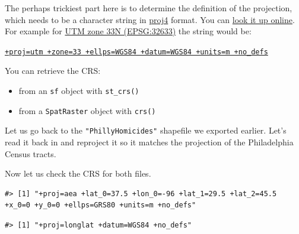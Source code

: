\documentclass[
]{book}
\newenvironment{Shaded}{\begin{snugshade}}{\end{snugshade}}
\newcommand{\CommentTok}[1]{\textcolor[rgb]{0.56,0.35,0.01}{\textit{#1}}}
\newcommand{\FunctionTok}[1]{\textcolor[rgb]{0.13,0.29,0.53}{\textbf{#1}}}
\newcommand{\NormalTok}[1]{#1}
\newcommand{\SpecialCharTok}[1]{\textcolor[rgb]{0.81,0.36,0.00}{\textbf{#1}}}
\providecommand{\tightlist}{%
  \setlength{\itemsep}{0pt}\setlength{\parskip}{0pt}}
\begin{document}
The perhaps trickiest part here is to determine the definition of the projection, which needs to be a character string in \href{http://trac.osgeo.org/proj/}{proj4} format. You can \href{http://www.spatialreference.org}{look it up online}. For example for \href{http://spatialreference.org/ref/epsg/wgs-84-utm-zone-33n/}{UTM zone 33N (EPSG:32633)} the string would be:

\href{http://spatialreference.org/ref/epsg/wgs-84-utm-zone-33n/proj4js/}{\texttt{+proj=utm\ +zone=33\ +ellps=WGS84\ +datum=WGS84\ +units=m\ +no\_defs}}

You can retrieve the CRS:

\begin{itemize}
\tightlist
\item
  from an \texttt{sf} object with \texttt{st\_crs()}
\item
  from a \texttt{SpatRaster} object with \texttt{crs()}
\end{itemize}

Let us go back to the \texttt{"PhillyHomicides"} shapefile we exported earlier. Let's read it back in and reproject it so it matches the projection of the Philadelphia Census tracts.

Now let us check the CRS for both files.

\begin{Shaded}
\end{Shaded}

\begin{verbatim}
#> [1] "+proj=aea +lat_0=37.5 +lon_0=-96 +lat_1=29.5 +lat_2=45.5 +x_0=0 +y_0=0 +ellps=GRS80 +units=m +no_defs"
\end{verbatim}

\begin{Shaded}
\end{Shaded}

\begin{verbatim}
#> [1] "+proj=longlat +datum=WGS84 +no_defs"
\end{verbatim}
\end{document}
